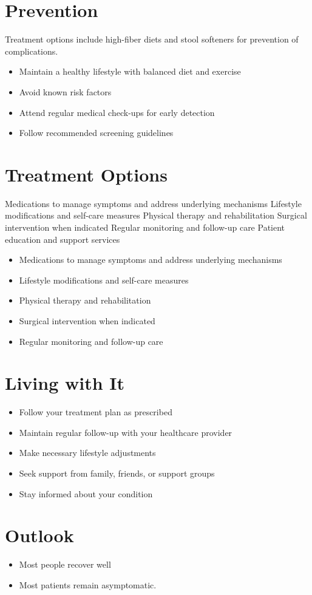 \section{Prevention}
Treatment options include high-fiber diets and stool softeners for prevention of complications.

\begin{itemize}[noitemsep]
  \item Maintain a healthy lifestyle with balanced diet and exercise
  \item Avoid known risk factors
  \item Attend regular medical check-ups for early detection
  \item Follow recommended screening guidelines
\end{itemize}
\section{Treatment Options}
Medications to manage symptoms and address underlying mechanisms Lifestyle modifications and self-care measures Physical therapy and rehabilitation Surgical intervention when indicated Regular monitoring and follow-up care Patient education and support services

\begin{itemize}[noitemsep]
  \item Medications to manage symptoms and address underlying mechanisms
  \item Lifestyle modifications and self-care measures
  \item Physical therapy and rehabilitation
  \item Surgical intervention when indicated
  \item Regular monitoring and follow-up care
\end{itemize}
\section{Living with It}
\begin{itemize}[noitemsep]
  \item Follow your treatment plan as prescribed
  \item Maintain regular follow-up with your healthcare provider
  \item Make necessary lifestyle adjustments
  \item Seek support from family, friends, or support groups
  \item Stay informed about your condition
\end{itemize}
\section{Outlook}
\begin{itemize}[noitemsep]
  \item Most people recover well
  \item Most patients remain asymptomatic.
\end{itemize}
